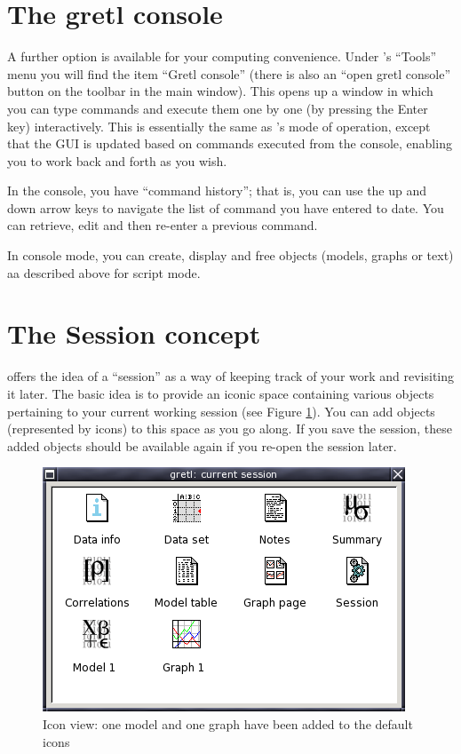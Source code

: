 \section{The gretl console}
\label{console}

A further option is available for your computing convenience. Under
's ``Tools'' menu you will find the item ``Gretl console''
(there is also an ``open gretl console'' button on the toolbar in the
main window).  This opens up a window in which you can type commands
and execute them one by one (by pressing the Enter key) interactively.
This is essentially the same as 's mode of operation,
except that the GUI is updated based on commands executed from the
console, enabling you to work back and forth as you wish.

In the console, you have ``command history''; that is, you can use the
up and down arrow keys to navigate the list of command you have
entered to date.  You can retrieve, edit and then re-enter a previous
command.

In console mode, you can create, display and free objects (models,
graphs or text) aa described above for script mode.

\section{The Session concept}
\label{session}

 offers the idea of a ``session'' as a way of keeping track
of your work and revisiting it later. The basic idea is to provide an
iconic space containing various objects pertaining to your current
working session (see Figure \ref{fig-session}).  You can add objects
(represented by icons) to this space as you go along.  If you save the
session, these added objects should be available again if you re-open
the session later.

\begin{figure}[htbp]
  \begin{center}
    \includegraphics[scale=0.5]{figures/session}
  \end{center}
  \caption{Icon view: one model and one graph have been added to the
    default icons}
  \label{fig-session}
\end{figure}

